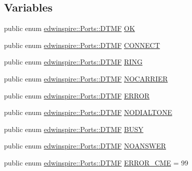 \subsection*{Variables}
\begin{DoxyCompactItemize}
\item 
public enum \hyperlink{namespaceedwinspire_1_1Ports_a64c52d3ccbb1de87e21d107a90581048}{edwinspire\-::\-Ports\-::\-D\-T\-M\-F} \hyperlink{namespaceedwinspire_1_1Ports_a1191f3cc7d9551eb34e7132001a853e0}{O\-K}
\item 
public enum \hyperlink{namespaceedwinspire_1_1Ports_a64c52d3ccbb1de87e21d107a90581048}{edwinspire\-::\-Ports\-::\-D\-T\-M\-F} \hyperlink{namespaceedwinspire_1_1Ports_a4731d81f93913b66f905116d11f1ae51}{C\-O\-N\-N\-E\-C\-T}
\item 
public enum \hyperlink{namespaceedwinspire_1_1Ports_a64c52d3ccbb1de87e21d107a90581048}{edwinspire\-::\-Ports\-::\-D\-T\-M\-F} \hyperlink{namespaceedwinspire_1_1Ports_ab5a72276d7d7c3f2c514022e6b00ac1f}{R\-I\-N\-G}
\item 
public enum \hyperlink{namespaceedwinspire_1_1Ports_a64c52d3ccbb1de87e21d107a90581048}{edwinspire\-::\-Ports\-::\-D\-T\-M\-F} \hyperlink{namespaceedwinspire_1_1Ports_ac657f72bb62779c0fdb9da9e078f6452}{N\-O\-C\-A\-R\-R\-I\-E\-R}
\item 
public enum \hyperlink{namespaceedwinspire_1_1Ports_a64c52d3ccbb1de87e21d107a90581048}{edwinspire\-::\-Ports\-::\-D\-T\-M\-F} \hyperlink{namespaceedwinspire_1_1Ports_a11d2af444a8113fa415c789c21d53b48}{E\-R\-R\-O\-R}
\item 
public enum \hyperlink{namespaceedwinspire_1_1Ports_a64c52d3ccbb1de87e21d107a90581048}{edwinspire\-::\-Ports\-::\-D\-T\-M\-F} \hyperlink{namespaceedwinspire_1_1Ports_a35dce5b5231bb3b067fd9794bd1dcc49}{N\-O\-D\-I\-A\-L\-T\-O\-N\-E}
\item 
public enum \hyperlink{namespaceedwinspire_1_1Ports_a64c52d3ccbb1de87e21d107a90581048}{edwinspire\-::\-Ports\-::\-D\-T\-M\-F} \hyperlink{namespaceedwinspire_1_1Ports_a429529c9b9db1b911c77e8d48f19cf1f}{B\-U\-S\-Y}
\item 
public enum \hyperlink{namespaceedwinspire_1_1Ports_a64c52d3ccbb1de87e21d107a90581048}{edwinspire\-::\-Ports\-::\-D\-T\-M\-F} \hyperlink{namespaceedwinspire_1_1Ports_a5d0c813f071f86a12381bb17b28229fe}{N\-O\-A\-N\-S\-W\-E\-R}
\item 
public enum \hyperlink{namespaceedwinspire_1_1Ports_a64c52d3ccbb1de87e21d107a90581048}{edwinspire\-::\-Ports\-::\-D\-T\-M\-F} \hyperlink{namespaceedwinspire_1_1Ports_aa0d4f92992391eb900d928c3ea2830ea}{E\-R\-R\-O\-R\-\_\-\-C\-M\-E} = 99

\end{DoxyCompactItemize}
